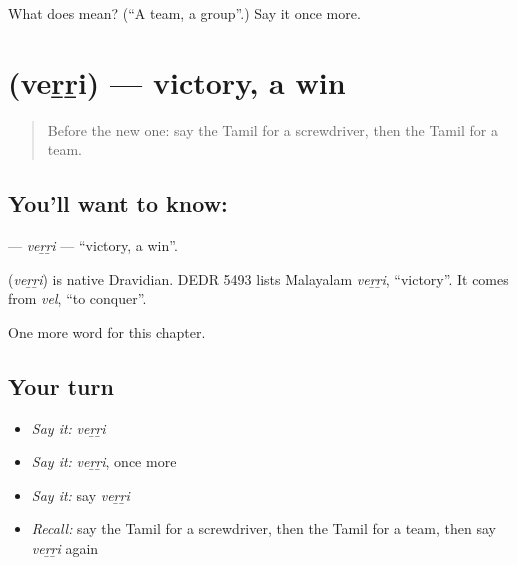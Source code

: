 \begin{tcolorbox}[breakable,colback=teal!4,colframe=teal!35!black,title={Before you move on}]
What does  mean? (\textquotedblleft{}A team, a group\textquotedblright{}.) Say it once more.
\end{tcolorbox}
\section[\texorpdfstring{\ta{வெற்றி} (veṟṟi)}{வெற்றி (veṟṟi)}]{ (veṟṟi) — victory, a win}

\label{lesson:TA-C277-verri}



\begin{quote}
Before the new one: say the Tamil for a screwdriver, then the Tamil for a team.
\end{quote}

\subsection*{You'll want to know: }
\textbf{} — \emph{veṟṟi} — \textquotedblleft{}victory, a win\textquotedblright{}.

\begin{cousinweb}
\textbf{} (\emph{veṟṟi}) is native Dravidian. DEDR 5493 lists Malayalam \emph{veṟṟi}, \textquotedblleft{}victory\textquotedblright{}. It comes from \emph{vel}, \textquotedblleft{}to conquer\textquotedblright{}.
\end{cousinweb}

\begin{grammarlens}[title={What you've built}]
One more word for this chapter.
\end{grammarlens}

\subsection*{Your turn}
\begin{itemize}
\raggedright
  \item \emph{Say it:} \emph{veṟṟi}
  \item \emph{Say it:} \emph{veṟṟi}, once more
  \item \emph{Say it:} say \emph{veṟṟi}
  \item \emph{Recall:} say the Tamil for a screwdriver, then the Tamil for a team, then say \emph{veṟṟi} again
\end{itemize}

